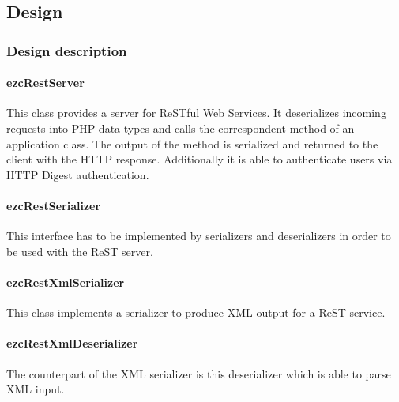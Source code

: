 \documentclass[10pt,final,a4paper,oneside]{article}
\begin{document}

\subsection{Design}\label{subsec:ReSTDesign}
%
%

\subsubsection{Design description}
\paragraph{ezcRestServer}
This class provides a server for ReSTful Web Services.
It deserializes incoming requests into PHP data types
and calls the correspondent method of an application class.
The output of the method is serialized
and returned to the client with the HTTP response.
Additionally it is able to authenticate users
via HTTP Digest authentication.


\paragraph{ezcRestSerializer}
This interface has to be implemented by serializers
and deserializers in order to be used with the
ReST server.

\paragraph{ezcRestXmlSerializer}
This class implements a serializer
to produce XML output for a ReST service.

\paragraph{ezcRestXmlDeserializer}
The counterpart of the XML serializer is this
deserializer which is able to parse XML input.
\end{document}
